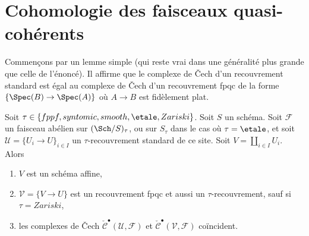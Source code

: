 \section{Cohomologie des faisceaux quasi-coh\'erents}
\label{section-cohomology-quasi-coherent}

\noindent
Commen\c{c}ons par un lemme simple (qui reste vrai dans une g\'en\'eralit\'e plus grande que
celle de l'\'enonc\'e). Il affirme que le complexe de {\v C}ech d'un recouvrement standard est
\'egal au complexe de {\v C}ech d'un recouvrement fpqc de la forme
$\{\Spec(B) \to \Spec(A)\}$ o\`u $A \to B$ est fid\`element plat.

\begin{lemma}
\label{lemma-cech-complex}
Soit $\tau \in \{fppf, syntomic, smooth, \etale, Zariski\}$.
Soit $S$ un sch\'ema.
Soit $\mathcal{F}$ un faisceau ab\'elien sur $(\Sch/S)_\tau$, ou sur
$S_\tau$ dans le cas o\`u $\tau = \etale$, et soit
$\mathcal{U} = \{U_i \to U\}_{i \in I}$
un $\tau$-recouvrement standard de ce site.
Soit $V = \coprod_{i \in I} U_i$. Alors
\begin{enumerate}
\item $V$ est un sch\'ema affine,
\item $\mathcal{V} = \{V \to U\}$ est un recouvrement fpqc
et aussi un $\tau$-recouvrement, sauf si $\tau = Zariski$,
\item les complexes de {\v C}ech
$\check{\mathcal{C}}^\bullet (\mathcal{U}, \mathcal{F})$ et
$\check{\mathcal{C}}^\bullet (\mathcal{V}, \mathcal{F})$ co\"incident.
\end{enumerate}
\end{lemma}

